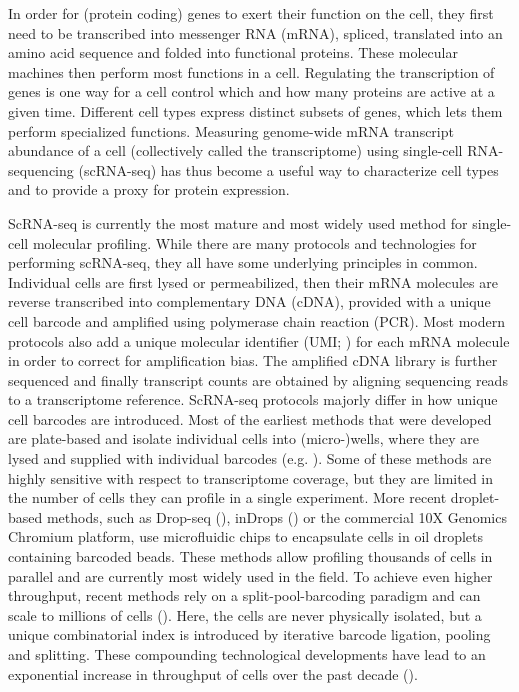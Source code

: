 In order for (protein coding) genes to exert their function on the cell, they first need to be transcribed into messenger RNA (mRNA), spliced, translated into an amino acid sequence and folded into functional proteins. These molecular machines then perform most functions in a cell. Regulating the transcription of genes is one way for a cell control which and how many proteins are active at a given time. Different cell types express distinct subsets of genes, which lets them perform specialized functions. Measuring genome-wide mRNA transcript abundance of a cell (collectively called the transcriptome) using single-cell RNA-sequencing (scRNA-seq) has thus become a useful way to characterize cell types and to provide a proxy for protein expression. 

ScRNA-seq is currently the most mature and most widely used method for single-cell molecular profiling. While there are many protocols and technologies for performing scRNA-seq, they all have some underlying principles in common. Individual cells are first lysed or permeabilized, then their mRNA molecules are reverse transcribed into complementary DNA (cDNA), provided with a unique cell barcode and amplified using polymerase chain reaction (PCR). Most modern protocols also add a unique molecular identifier (UMI; \cite{islam_quantitative_2014}) for each mRNA molecule in order to correct for amplification bias. The amplified cDNA library is further sequenced and finally transcript counts are obtained by aligning sequencing reads to a transcriptome reference. ScRNA-seq protocols majorly differ in how unique cell barcodes are introduced. Most of the earliest methods that were developed are plate-based and isolate individual cells into (micro-)wells, where they are lysed and supplied with individual barcodes (e.g. \cite{picelli_smart-seq2_2013,shalek_single-cell_2014,jaitin_massively_2014,treutlein_reconstructing_2014}). Some of these methods are highly sensitive with respect to transcriptome coverage, but they are limited in the number of cells they can profile in a single experiment. More recent droplet-based methods, such as Drop-seq (\cite{macosko_highly_2015}), inDrops (\cite{klein_droplet_2015}) or the commercial 10X Genomics Chromium platform, use microfluidic chips to encapsulate cells in oil droplets containing barcoded beads. These methods allow profiling thousands of cells in parallel and are currently most widely used in the field. To achieve even higher throughput, recent methods rely on a split-pool-barcoding paradigm and can scale to millions of cells (\cite{rosenberg_single-cell_2018,yin_high-throughput_2019,cao_comprehensive_2017}). Here, the cells are never physically isolated, but a unique combinatorial index is introduced by iterative barcode ligation, pooling and splitting. These compounding technological developments have lead to an exponential increase in throughput of cells over the past decade (\cite{svensson_exponential_2018}).

